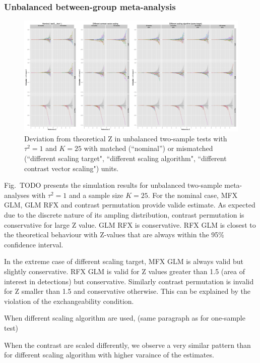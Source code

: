 \documentclass[preprint]{elsarticle}
\newcommand{\nStudies}{K}
\newcommand{\varBetween}{\tau^2}
\begin{document}
\subsubsection{Unbalanced between-group meta-analysis}

\begin{figure}[t]
	\centering
 	\includegraphics[width=0.99\linewidth]{./figures/test3_btw1.png}
	\caption{Deviation from theoretical Z in unbalanced two-sample tests with $\varBetween=1$ and $\nStudies = 25$ with matched (``nominal'') or mismatched (``different scaling target", ``different scaling algorithm", ``different contrast vector scaling") units.}
	\label{test3_btw1}
\end{figure}

Fig.~TODO presents the simulation results for unbalanced two-sample meta-analyses with $\varBetween=1$ and a sample size $\nStudies = 25$. For the nominal case, MFX GLM, GLM RFX and contrast permutation provide valide estimate. As expected due to the discrete nature of its ampling distribution, contrast permutation is conservative for large Z value. GLM RFX is conservative. RFX GLM is closest to the theoretical behaviour with Z-values that are always within the 95\% confidence interval.

In the extreme case of different scaling target, MFX GLM is always valid but slightly conservative. RFX GLM is valid for Z values greater than 1.5 (area of interest in detections) but conservative. Similarly contrast permutation is invalid for Z smaller than 1.5 and conservative otherwise. This can be explained by the violation of the exchangeability condition.

When different scaling algorithm are used, (same paragraph as for one-sample test)

When the contrast are scaled differently, we observe a very similar pattern than for different scaling algorithm with higher varaince of the estimates.
\end{document}
